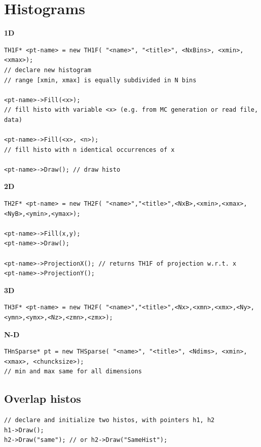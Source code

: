 \documentclass[10pt, oneside]{article}
\begin{document}
\section{Histograms}
\textbf{1D}
\begin{verbatim}
TH1F* <pt-name> = new TH1F( "<name>", "<title>", <NxBins>, <xmin>, <xmax>);
// declare new histogram
// range [xmin, xmax] is equally subdivided in N bins

<pt-name>->Fill(<x>); 
// fill histo with variable <x> (e.g. from MC generation or read file, data)

<pt-name>->Fill(<x>, <n>);
// fill histo with n identical occurrences of x

<pt-name>->Draw(); // draw histo
\end{verbatim}
\textbf{2D}
\begin{verbatim}
TH2F* <pt-name> = new TH2F( "<name>","<title>",<NxB>,<xmin>,<xmax>,<NyB>,<ymin>,<ymax>);

<pt-name>->Fill(x,y);
<pt-name>->Draw();

<pt-name>->ProjectionX(); // returns TH1F of projection w.r.t. x
<pt-name>->ProjectionY();
\end{verbatim}
\textbf{3D}
\begin{verbatim}
TH3F* <pt-name> = new TH2F( "<name>","<title>",<Nx>,<xmn>,<xmx>,<Ny>,<ymn>,<ymx>,<Nz>,<zmn>,<zmx>);
\end{verbatim}
\textbf{N-D}
\begin{verbatim}
THnSparse* pt = new THSparse( "<name>", "<title>", <Ndims>, <xmin>, <xmax>, <chuncksize>); 
// min and max same for all dimensions
\end{verbatim}

\subsection{Overlap histos}
\begin{verbatim}
// declare and initialize two histos, with pointers h1, h2
h1->Draw();
h2->Draw("same"); // or h2->Draw("SameHist");
\end{verbatim}
\end{document}
